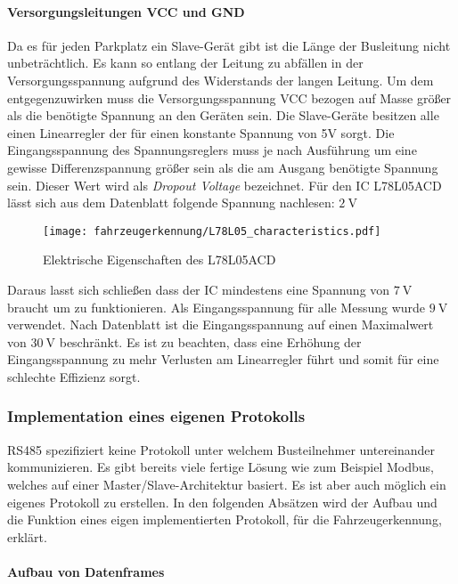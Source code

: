 \paragraph{Versorgungsleitungen VCC und GND}\mbox{}

Da es für jeden Parkplatz ein Slave-Gerät gibt ist die Länge der Busleitung nicht unbeträchtlich. Es kann so entlang der Leitung zu abfällen in der Versorgungsspannung aufgrund des Widerstands der langen Leitung.
Um dem entgegenzuwirken muss die Versorgungsspannung VCC bezogen auf Masse größer als die benötigte Spannung an den Geräten sein. Die Slave-Geräte besitzen alle einen Linearregler der für einen konstante Spannung von 5V sorgt.
Die Eingangsspannung des Spannungsreglers muss je nach Ausführung um eine gewisse Differenzspannung größer sein als die am Ausgang benötigte Spannung sein. Dieser Wert wird als \textit{Dropout Voltage} bezeichnet. 
Für den IC L78L05ACD lässt sich aus dem Datenblatt folgende Spannung nachlesen: $\SI{2}{\volt}$

\begin{figure}[H]
    \centering
    \texttt{[image: fahrzeugerkennung/L78L05\_characteristics.pdf]}
    \caption{Elektrische Eigenschaften des L78L05ACD}
\end{figure}

Daraus lasst sich schließen dass der IC mindestens eine Spannung von $\SI{7}{\volt}$ braucht um zu funktionieren. Als Eingangsspannung für alle Messung wurde $\SI{9}{\volt}$ verwendet. Nach Datenblatt ist die Eingangsspannung auf 
einen Maximalwert von $\SI{30}{\volt}$ beschränkt. Es ist zu beachten, dass eine Erhöhung der Eingangsspannung zu mehr Verlusten am Linearregler führt und somit für eine schlechte Effizienz sorgt.

\subsubsection{Implementation eines eigenen Protokolls}

RS485 spezifiziert keine Protokoll unter welchem Busteilnehmer untereinander kommunizieren. Es gibt bereits viele fertige Lösung wie zum Beispiel Modbus, welches auf einer Master/Slave-Architektur basiert. Es ist aber auch möglich ein eigenes Protokoll zu erstellen.
In den folgenden Absätzen wird der Aufbau und die Funktion eines eigen implementierten Protokoll, für die Fahrzeugerkennung, erklärt.
\pagebreak
\paragraph{Aufbau von Datenframes}\mbox{}

